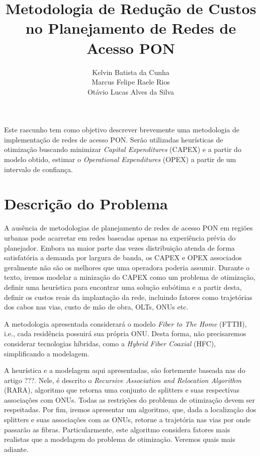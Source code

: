 \documentclass[12pt]{article}
\title{Metodologia de Redução de Custos no Planejamento de Redes de Acesso PON}
\author{Kelvin Batista da Cunha\\
Marcus Felipe Raele Rios\\
Otávio Lucas Alves da Silva
}
\begin{document}
 

\maketitle
\begin{resumo} 
Este rascunho tem como objetivo  descrever brevemente uma metodologia de implementação de redes de acesso PON.
Serão utilizadas heurísticas de otimização buscando minimizar \textit{Capital Expenditures} (CAPEX) e a partir do modelo obtido, estimar 
o \textit{Operational Expenditures} (OPEX) a partir de um intervalo de confiança.
\end{resumo}


\section{Descrição do Problema}

A ausência de metodologias de planejamento de redes de acesso PON em regiões  urbanas pode acarretar em redes baseadas apenas na experiência prévia do planejador. Embora  na maior parte das vezes distribuição atenda de forma satisfatória a demanda por largura de banda, os CAPEX e OPEX associados geralmente não são os melhores que uma operadora poderia assumir. Durante o texto, iremos modelar a minização do CAPEX como um problema de otimização, definir uma heurística para encontrar uma solução subótima e a partir desta, definir os custos reais da implantação da rede, incluindo fatores como trajetórias dos cabos nas vias, custo de mão de obra, OLTs, ONUs etc.

A metodologia apresentada considerará o modelo \textit{Fiber to The Home} (FTTH), i.e., cada residência possuirá sua própria ONU. Desta forma, não precisaremos considerar  tecnologias híbridas, como a \textit{Hybrid Fiber Coaxial} (HFC), simplificando a modelagem.

A heurística e a modelagem aqui apresentadas, são fortemente baseada nas do artigo ???. Nele, é descrito o \textit{Recursive Association and Relocation Algorithm} (RARA), algoritmo que retorna uma conjunto de splitters e suas respectivas associações com ONUs. Todas as restrições do problema de otimização devem ser respeitadas. Por fim, iremos apresentar um algoritmo, que, dada a localização dos splitters e suas associações com as ONUs, retorne a trajetória nas vias por onde passarão as fibras. Particularmente, este algoritmo considera fatores mais realistas que a modelagem do problema de otimização. Veremos quais mais adiante.
\end{document}

